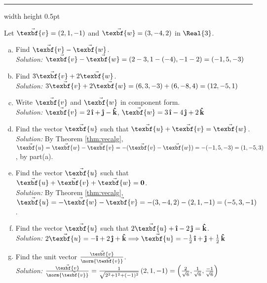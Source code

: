 \hrule width \textwidth height 0.5pt
\begin{exmp}
 Let $\vec{\texbf{v}} = (2,1,-1)$ and $\vec{\texbf{w}} = (3,-4,2)$ in $\Real{3}$.
 \begin{enumerate}[(a)]
  \item Find $\vec{\texbf{v}} - \vec{\texbf{w}}$.\\\emph{Solution:} $\vec{\texbf{v}} - \vec{\texbf{w}} =
   (2 - 3,1 - (-4), -1 - 2) = (-1,5,-3)$
  \item Find $3\vec{\texbf{v}} + 2\vec{\texbf{w}}$.\\\emph{Solution:} $3\vec{\texbf{v}} + 2\vec{\texbf{w}} = (6,3,-3) + (6,-8,4) =
   (12,-5,1)$
  \item Write $\vec{\texbf{v}}$ and $\vec{\texbf{w}}$ in component form.\\\emph{Solution:}
   $\vec{\texbf{v}} = 2\,\boldsymbol{\hat{\textbf{\i}}} + \boldsymbol{\hat{\textbf{\j}}} - \boldsymbol{\hat{\textbf{k}}}$, $\vec{\texbf{w}} = 3\,\boldsymbol{\hat{\textbf{\i}}} - 4\,\boldsymbol{\hat{\textbf{\j}}} + 2\,\boldsymbol{\hat{\textbf{k}}}$
  \item Find the vector $\vec{\texbf{u}}$ such that $\vec{\texbf{u}} + \vec{\texbf{v}} = \vec{\texbf{w}}$.\\\emph{Solution:} By Theorem
   \ref{thm:vecalg}, $\vec{\texbf{u}} = \vec{\texbf{w}} - \vec{\texbf{v}} = -(\vec{\texbf{v}} - \vec{\texbf{w}}) = -(-1,5,-3) = (1,-5,3)$, by
   part(a).
  \item Find the vector $\vec{\texbf{u}}$ such that $\vec{\texbf{u}} + \vec{\texbf{v}} + \vec{\texbf{w}} = \textbf{0}$.\\\emph{Solution:}
   By Theorem \ref{thm:vecalg}, $\vec{\texbf{u}} = -\vec{\texbf{w}} - \vec{\texbf{v}} = -(3,-4,2) - (2,1,-1) = (-5,3,-1)$.
  \item Find the vector $\vec{\texbf{u}}$ such that $2\vec{\texbf{u}} + \boldsymbol{\hat{\textbf{\i}}} - 2\,\boldsymbol{\hat{\textbf{\j}}} = \boldsymbol{\hat{\textbf{k}}}$.\\\emph{Solution:}
   $2\vec{\texbf{u}} = -\boldsymbol{\hat{\textbf{\i}}} + 2\,\boldsymbol{\hat{\textbf{\j}}} + \boldsymbol{\hat{\textbf{k}}} \Longrightarrow \vec{\texbf{u}} = -\frac{1}{2}\,\boldsymbol{\hat{\textbf{\i}}} +
  \boldsymbol{\hat{\textbf{\j}}} + \frac{1}{2}\,\boldsymbol{\hat{\textbf{k}}}$
  \item Find the unit vector $\frac{\vec{\texbf{v}}}{\norm{\vec{\texbf{v}}}}$.\\\emph{Solution:}
   $\frac{\vec{\texbf{v}}}{\norm{\vec{\texbf{v}}}} = \frac{1}{\sqrt{2^2 + 1^2 + (-1)^2}} \,(2,1,-1) =
   \left ( \frac{2}{\sqrt{6}},\frac{1}{\sqrt{6}},\frac{-1}{\sqrt{6}} \right )$
 \end{enumerate} 
\end{exmp}
